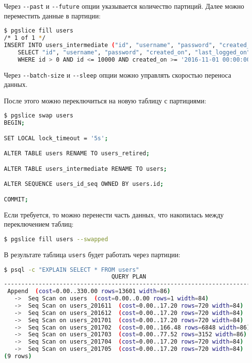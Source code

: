 Через \lstinline!--past! и \lstinline!--future! опции указывается количество партиций. Далее можно переместить данные в партиции:

\begin{lstlisting}[language=Bash,label=lst:pgslice6,caption=Pgslice fill]
$ pgslice fill users
/* 1 of 1 */
INSERT INTO users_intermediate ("id", "username", "password", "created_on", "last_logged_on")
    SELECT "id", "username", "password", "created_on", "last_logged_on" FROM users
    WHERE id > 0 AND id <= 10000 AND created_on >= '2016-11-01 00:00:00 UTC'::timestamptz AND created_on < '2017-06-01 00:00:00 UTC'::timestamptz
\end{lstlisting}

Через \lstinline!--batch-size! и \lstinline!--sleep! опции можно управлять скоростью переноса данных.

После этого можно переключиться на новую таблицу с партициями:

\begin{lstlisting}[language=Bash,label=lst:pgslice7,caption=Pgslice swap]
$ pgslice swap users
BEGIN;

SET LOCAL lock_timeout = '5s';

ALTER TABLE users RENAME TO users_retired;

ALTER TABLE users_intermediate RENAME TO users;

ALTER SEQUENCE users_id_seq OWNED BY users.id;

COMMIT;
\end{lstlisting}

Если требуется, то можно перенести часть данных, что накопилась между переключением таблиц:

\begin{lstlisting}[language=Bash,label=lst:pgslice8,caption=Pgslice fill]
$ pgslice fill users --swapped
\end{lstlisting}

В результате таблица \lstinline!users! будет работать через партиции:

\begin{lstlisting}[language=Bash,label=lst:pgslice_sample1,caption=Результат]
$ psql -c "EXPLAIN SELECT * FROM users"
                               QUERY PLAN
------------------------------------------------------------------------
 Append  (cost=0.00..330.00 rows=13601 width=86)
   ->  Seq Scan on users  (cost=0.00..0.00 rows=1 width=84)
   ->  Seq Scan on users_201611  (cost=0.00..17.20 rows=720 width=84)
   ->  Seq Scan on users_201612  (cost=0.00..17.20 rows=720 width=84)
   ->  Seq Scan on users_201701  (cost=0.00..17.20 rows=720 width=84)
   ->  Seq Scan on users_201702  (cost=0.00..166.48 rows=6848 width=86)
   ->  Seq Scan on users_201703  (cost=0.00..77.52 rows=3152 width=86)
   ->  Seq Scan on users_201704  (cost=0.00..17.20 rows=720 width=84)
   ->  Seq Scan on users_201705  (cost=0.00..17.20 rows=720 width=84)
(9 rows)
\end{lstlisting}

